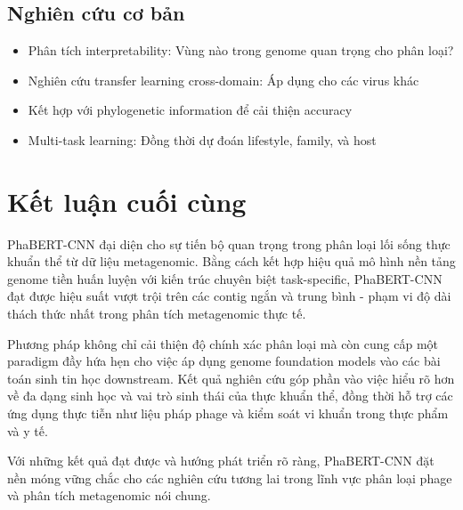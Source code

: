 \subsection{Nghiên cứu cơ bản}

\begin{itemize}
    \item Phân tích interpretability: Vùng nào trong genome quan trọng cho phân loại?
    \item Nghiên cứu transfer learning cross-domain: Áp dụng cho các virus khác
    \item Kết hợp với phylogenetic information để cải thiện accuracy
    \item Multi-task learning: Đồng thời dự đoán lifestyle, family, và host
\end{itemize}

\section{Kết luận cuối cùng}

PhaBERT-CNN đại diện cho sự tiến bộ quan trọng trong phân loại lối sống thực khuẩn thể từ dữ liệu metagenomic. Bằng cách kết hợp hiệu quả mô hình nền tảng genome tiền huấn luyện với kiến trúc chuyên biệt task-specific, PhaBERT-CNN đạt được hiệu suất vượt trội trên các contig ngắn và trung bình - phạm vi độ dài thách thức nhất trong phân tích metagenomic thực tế.

Phương pháp không chỉ cải thiện độ chính xác phân loại mà còn cung cấp một paradigm đầy hứa hẹn cho việc áp dụng genome foundation models vào các bài toán sinh tin học downstream. Kết quả nghiên cứu góp phần vào việc hiểu rõ hơn về đa dạng sinh học và vai trò sinh thái của thực khuẩn thể, đồng thời hỗ trợ các ứng dụng thực tiễn như liệu pháp phage và kiểm soát vi khuẩn trong thực phẩm và y tế.

Với những kết quả đạt được và hướng phát triển rõ ràng, PhaBERT-CNN đặt nền móng vững chắc cho các nghiên cứu tương lai trong lĩnh vực phân loại phage và phân tích metagenomic nói chung.